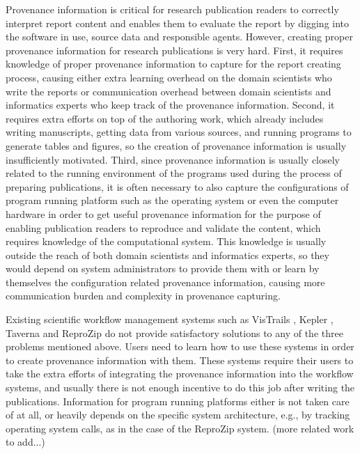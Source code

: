  
 
Provenance information is critical for research publication readers to correctly interpret report content and enables them to evaluate the report by digging into the software in use, source data and responsible agents. However, creating proper provenance information for research publications is very hard. First, it requires knowledge of proper provenance information to capture for the report creating process, causing either extra learning overhead on the domain scientists who write the reports or communication overhead between domain scientists and informatics experts who keep track of the provenance information. Second, it requires extra efforts on top of the authoring work, which already includes writing manuscripts, getting data from various sources, and running programs to generate tables and figures, so the creation of provenance information is usually insufficiently motivated. Third, since provenance information is usually closely related to the running environment of the programs used during the process of preparing publications, it is often necessary to also capture the configurations of program running platform such as the operating system or even the computer hardware in order to get useful provenance information for the purpose of enabling publication readers to reproduce and validate the content, which requires knowledge of the computational system. This knowledge is usually outside the reach of both domain scientists and informatics experts, so they would depend on system administrators to provide them with or learn by themselves the configuration related provenance information, causing more communication burden and complexity in provenance capturing.

Existing scientific workflow management systems such as VisTrails \cite{Freire2014}, Kepler \cite{Ludascher2005}, Taverna \cite{Taverna} and ReproZip \cite{Chirigati2013} do not provide satisfactory solutions to any of the three problems mentioned above. Users need to learn how to use these systems in order to create provenance information with them. These systems require their users to take the extra efforts of integrating the provenance information into the workflow systems, and usually there is not enough incentive to do this job after writing the publications. Information for program running platforms either is not taken care of at all, or heavily depends on the specific system architecture, e.g., by tracking operating system calls, as in the case of the ReproZip system. (more related work to add...)

